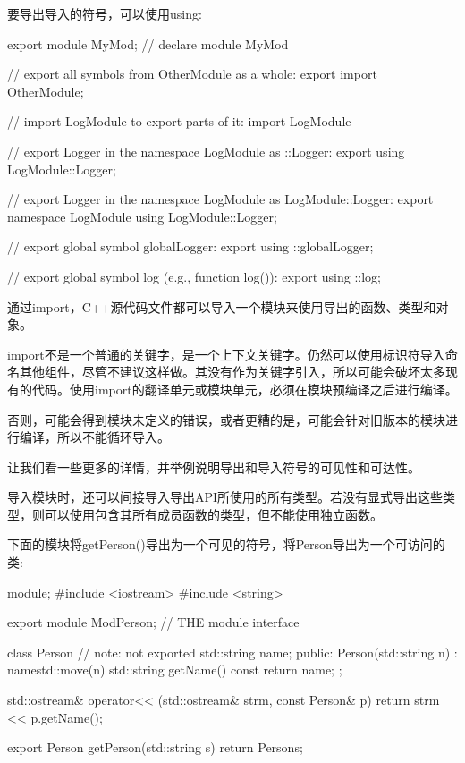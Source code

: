 要导出导入的符号，可以使用using:

\begin{cpp}
export module MyMod; // declare module MyMod

// export all symbols from OtherModule as a whole:
export import OtherModule;

// import LogModule to export parts of it:
import LogModule

// export Logger in the namespace LogModule as ::Logger:
export using LogModule::Logger;

// export Logger in the namespace LogModule as LogModule::Logger:
export namespace LogModule {
	using LogModule::Logger;
}

// export global symbol globalLogger:
export using ::globalLogger;

// export global symbol log (e.g., function log()):
export using ::log;
\end{cpp}


通过import，C++源代码文件都可以导入一个模块来使用导出的函数、类型和对象。

import不是一个普通的关键字，是一个上下文关键字。仍然可以使用标识符导入命名其他组件，尽管不建议这样做。其没有作为关键字引入，所以可能会破坏太多现有的代码。使用import的翻译单元或模块单元，必须在模块预编译之后进行编译。

否则，可能会得到模块未定义的错误，或者更糟的是，可能会针对旧版本的模块进行编译，所以不能循环导入。


让我们看一些更多的详情，并举例说明导出和导入符号的可见性和可达性。

导入模块时，还可以间接导入导出API所使用的所有类型。若没有显式导出这些类型，则可以使用包含其所有成员函数的类型，但不能使用独立函数。

下面的模块将getPerson()导出为一个可见的符号，将Person导出为一个可访问的类:


\begin{cpp}
module;
#include <iostream>
#include <string>

export module ModPerson; // THE module interface

class Person { // note: not exported
	std::string name;
public:
	Person(std::string n)
	: name{std::move(n)} {
	}
	std::string getName() const {
		return name;
	}
};

std::ostream& operator<< (std::ostream& strm, const Person& p)
{
	return strm << p.getName();
}

export Person getPerson(std::string s) {
	return Person{s};
}
\end{cpp}


